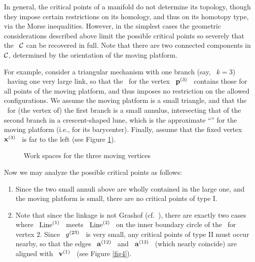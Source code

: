 \begin{example}\label{egcrit}
%
In general, the critical points of a manifold do not determine its
topology, though they impose certain restrictions on its
homology, and thus on its homotopy type, via the Morse inequalities.
However, in the simplest cases the geometric considerations described
above limit the possible critical points so severely that the \cspace\
$\mathcal{C}$ can be recovered in full. Note that there are two connected
components in $\mathcal{C}$, determined by the orientation of the moving
platform\vsm .

For example, consider a triangular mechanism with one branch (say, \
$k=3$) \ having one very large link, so that the
\wspace\ for the vertex \ $\mathbf{p}\sp{({3})}$ \ contains those for all points of
the moving platform, and thus imposes no restriction on the allowed
configurations.  We assume the moving platform is a small triangle,
and that the \wspace\ for (the vertex of) the first branch is a small
annulus, intersecting that of the second branch in a crescent-shaped
lune, which is the approximate ``\wspace'' for the moving platform
(i.e., for its barycenter). Finally,  assume that the fixed
vertex \ $\mathbf{x}\sp{({3})}$ \ is far to the left (see Figure \ref{fmechanism}).

\begin{figure}[htbp]
\begin{center}
\epsfysize=4cm %
\leavevmode {} \caption{Work spaces
for the
 three moving vertices}\label{fmechanism}
\end{center}
\end{figure}

Now we may analyze the possible critical points as follows:

\begin{enumerate}
\renewcommand{\labelenumi}{(\arabic{enumi})}
%
\item Since the two small annuli above are wholly contained in the
  large one, and the moving platform is small, there are no
  critical points of type I.
%
\item Note that since the linkage is not Grashof (cf.\ \cite{KM}),
there are exactly two cases where \ $\operatorname{Line}\sp{({1})}$ \
meets \ $\operatorname{Line}\sp{({2})}$ \ on the inner boundary circle of the \wspace\ for
vertex $2$. Since \ $g\sp{({23})}$ \ is very small, any critical points
of type II must occur nearby, so that the edges \ $\mathbf{a}\sp{({12})}$ \ and \
$\mathbf{a}\sp{({13})}$ \ (which nearly coincide) are aligned with \ $\mathbf{v}\sp{({1})}$ \
(see Figure \ref{fig4}).


\end{enumerate}
\end{example}
